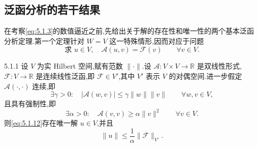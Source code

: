 \subsection{泛函分析的若干结果}\label{sec:5.1.1}

在考察\eqref{eq:5.1.3}的数值逼近之前,先给出关于解的存在性和唯一性的两个基本泛函分析定理.第一个定理针对 \(W=V\) 这一特殊情形,因而对应于问题
\begin{equation}\label{eq:5.1.12}
  \text{求 }u\in V,\quad \mathcal A(u,v)=\mathcal F(v)
  \qquad\forall v\in V.
\end{equation}

\begin{theorem}{5.1.1}
设 \(V\) 为实 Hilbert 空间,赋有范数 \(\|\cdot\|\).设 \(\mathcal A\colon V\times V\to\mathbb R\) 是双线性形式,\(\mathcal F\colon V\to\mathbb R\) 是连续线性泛函,即 \(\mathcal F\in V'\),其中 \(V'\) 表示 \(V\) 的对偶空间.进一步假定 \(\mathcal A(\cdot,\cdot)\) 连续,即
\begin{equation}\label{eq:5.1.13}
  \exists\gamma>0:\quad |\mathcal A(w,v)|\le\gamma\|w\|\|v\|
  \qquad\forall w,v\in V,
\end{equation}
且具有强制性,即
\begin{equation}\label{eq:5.1.14}
  \exists\alpha>0:\quad\mathcal A(v,v)\ge\alpha\|v\|^2\qquad\forall v\in V.
\end{equation}
则\eqref{eq:5.1.12}存在唯一解 \(u\in V\),并且
\begin{equation}\label{eq:5.1.15}
  \|u\|\le\frac1\alpha\|\mathcal F\|_{V'}.
\end{equation}
\end{theorem}

